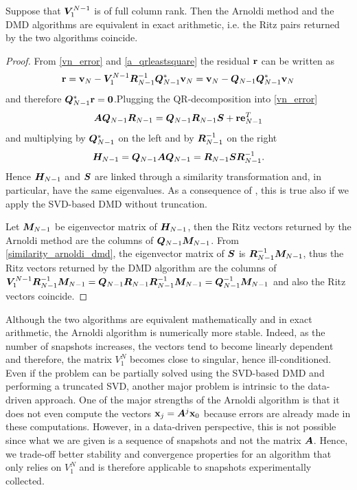 \begin{prop}
Suppose that $\vb*{V}_1^{N-1}$ is of full column rank. Then the Arnoldi method and the DMD algorithms are equivalent in exact arithmetic, i.e. the Ritz pairs returned by the two algorithms coincide. 
\end{prop}
\begin{proof}
From \eqref{vn_error} and \eqref{a_qrleastsquare} the residual $\vb{r}$ can be written as
\begin{equation*}
    \vb{r} = \vb{v}_N - \vb*{V}_1^{N-1}\vb*{R}_{N-1}^{-1}\vb*{Q}_{N-1}^*\vb{v}_N = \vb{v}_N - \vb*{Q}_{N-1}\vb*{Q}_{N-1}^*\vb{v}_N
\end{equation*}
and therefore $\vb*{Q}_{N-1}^*\vb{r} = \vb*{0}$.Plugging the QR-decomposition into \eqref{vn_error}
\begin{equation*}
    \vb*{A}\vb*{Q}_{N-1}\vb*{R}_{N-1} = \vb*{Q}_{N-1}\vb*{R}_{N-1}\vb*{S} + \vb{r}\vb{e}_{N-1}^T
\end{equation*}
and multiplying by $\vb*{Q}_{N-1}^*$ on the left and by $\vb*{R}_{N-1}^{-1}$ on the right
\begin{equation}
    \label{similarity_arnoldi_dmd}
    \vb*{H}_{N-1} = \vb*{Q}_{N-1}\vb*{A}\vb*{Q}_{N-1} = \vb*{R}_{N-1}\vb*{S}\vb*{R}_{N-1}^{-1}.
\end{equation}
Hence $\vb*{H}_{N-1}$ and $\vb*{S}$ are linked through a similarity transformation and, in particular, have the same eigenvalues. As a consequence of , this is true also if we apply the SVD-based DMD without truncation.

Let $\vb*{M}_{N-1}$ be eigenvector matrix of $\vb*{H}_{N-1}$, then the Ritz vectors returned by the Arnoldi method are the columns of $\vb*{Q}_{N-1}\vb*{M}_{N-1}$. From \eqref{similarity_arnoldi_dmd}, the eigenvector matrix of $\vb*{S}$ is $\vb*{R}_{N-1}^{-1}\vb*{M}_{N-1}$, thus the Ritz vectors returned by the DMD algorithm are the columns of $\vb*{V}_1^{N-1}\vb*{R}_{N-1}^{-1}\vb*{M}_{N-1} = \vb*{Q}_{N-1}\vb*{R}_{N-1}\vb*{R}_{N-1}^{-1}\vb*{M}_{N-1} = \vb*{Q}_{N-1}^{-1}\vb*{M}_{N-1}$ and also the Ritz vectors coincide.
\end{proof}


Although the two algorithms are equivalent mathematically and in exact arithmetic, the Arnoldi algorithm is numerically more stable. Indeed, as the number of snapshots increases, the vectors tend to become linearly dependent and therefore, the matrix $V_1^N$ becomes close to singular, hence ill-conditioned. Even if the problem can be partially solved using the SVD-based DMD and performing a truncated SVD, another major problem is intrinsic to the data-driven approach. One of the major strengths of the Arnoldi algorithm is that it does not even compute the vectors $\vb{x}_j = \vb*{A}^j \vb{x}_0$ because errors are already made in these computations. However, in a data-driven perspective, this is not possible since what we are given is a sequence of snapshots and not the matrix $\vb*{A}$. Hence, we trade-off better stability and convergence properties for an algorithm that only relies on $V_1^N$ and is therefore applicable to snapshots experimentally collected.

